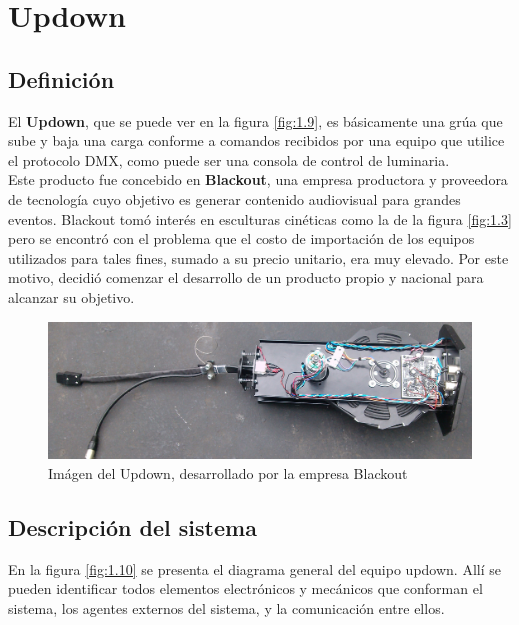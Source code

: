 \section{Updown} \label{sec:\thesection}
\subsection{Definición}
El \textbf{Updown}, que se puede ver en la figura \ref{fig:1.9}, es básicamente una grúa que sube y baja una carga conforme a comandos recibidos por una equipo que utilice el protocolo DMX, como puede ser una consola de control de luminaria.\\

Este producto fue concebido en \textbf{Blackout}, una empresa productora y proveedora de tecnología cuyo objetivo es generar contenido audiovisual para grandes eventos. Blackout tomó interés en esculturas cinéticas como la de la figura \ref{fig:1.3} pero se encontró con el problema que el costo de importación de los equipos utilizados para tales fines, sumado a su precio unitario, era muy elevado. Por este motivo, decidió comenzar el desarrollo de un producto propio y nacional para alcanzar su objetivo.\\

\begin{figure}[!ht]
	\centering
	\includegraphics[width=15cm,scale=1]{resources/1_9-updown.jpg}
	\caption{Imágen del Updown, desarrollado por la empresa Blackout}
	\label{fig:\thefigure}
\end{figure}
\newpage
\subsection{Descripción del sistema}

En la figura \ref{fig:1.10} se presenta el diagrama general del equipo updown. Allí se pueden identificar todos elementos electrónicos y mecánicos que conforman el sistema, los agentes externos del sistema, y la comunicación entre ellos.


